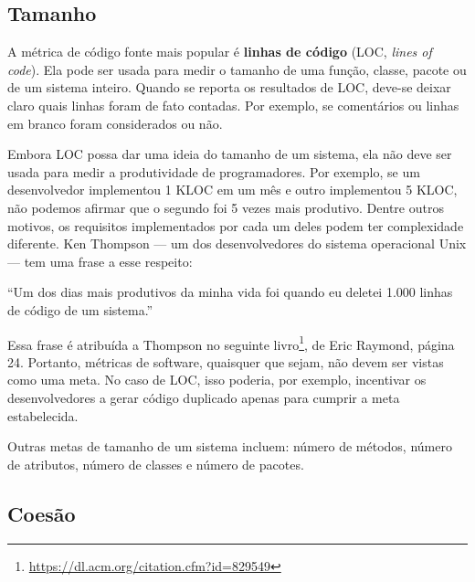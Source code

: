 \documentclass[
  11pt,
  twoside]{book}
\DeclareRobustCommand{\href}[2]{#2\footnote{\url{#1}}}
\renewenvironment{quote}{\centering \vspace{1.5ex} \begin{tcolorbox}[colback=backcolor, width=4.9in]}{\end{tcolorbox}}
\begin{document}
\hypertarget{tamanho}{%
\subsection{Tamanho}\label{tamanho}}

 A métrica de código fonte mais popular é
\textbf{linhas de código} (LOC, \emph{lines of code}). Ela pode ser
usada para medir o tamanho de uma função, classe, pacote ou de um
sistema inteiro. Quando se reporta os resultados de LOC, deve-se deixar
claro quais linhas foram de fato contadas. Por exemplo, se comentários
ou linhas em branco foram considerados ou não.

Embora LOC possa dar uma ideia do tamanho de um sistema, ela não deve
ser usada para medir a produtividade de programadores. Por exemplo, se
um desenvolvedor implementou 1 KLOC em um mês e outro implementou 5
KLOC, não podemos afirmar que o segundo foi 5 vezes mais produtivo.
Dentre outros motivos, os requisitos implementados por cada um deles
podem ter complexidade diferente. Ken Thompson --- um dos
desenvolvedores do sistema operacional Unix --- tem uma frase a esse
respeito:


\begin{quote}
``Um dos dias mais produtivos da minha vida foi quando eu deletei 1.000
linhas de código de um sistema.''
\end{quote}

Essa frase é atribuída a Thompson no seguinte
\href{https://dl.acm.org/citation.cfm?id=829549}{livro}, de Eric
Raymond, página 24. Portanto, métricas de software, quaisquer que sejam,
não devem ser vistas como uma meta. No caso de LOC, isso poderia, por
exemplo, incentivar os desenvolvedores a gerar código duplicado apenas
para cumprir a meta estabelecida.

Outras metas de tamanho de um sistema incluem: número de métodos, número
de atributos, número de classes e número de pacotes.

\hypertarget{coesuxe3o-1}{%
\subsection{Coesão}\label{coesuxe3o-1}}

\end{document}
